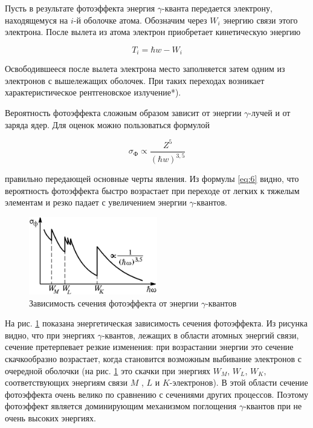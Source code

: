 \documentclass[a4paper,12pt]{article}
\begin{document}
Пусть в результате фотоэффекта энергия $\gamma$-кванта передается электрону, находящемуся на $i$-й оболочке атома. Обозначим через $W_i$ энергию связи этого электрона. После вылета из атома электрон приобретает кинетическую энергию

\begin{equation}\label{eq:5}
    T_i = \hbar w - W_i
\end{equation}

Освободившееся после вылета электрона место заполняется затем одним из электронов с вышележащих оболочек. При таких переходах возникает характеристическое рентгеновское излучение*).

Вероятность фотоэффекта сложным образом зависит от энергии $\gamma$-лучей и от заряда ядер. Для оценок можно пользоваться формулой

\begin{equation}\label{eq:6}
    \sigma_\text{Ф} \propto \frac{Z^5}{\left( \hbar w \right)^{3,5}}
\end{equation}

правильно передающей основные черты явления. Из формулы \eqref{eq:6} видно, что вероятность фотоэффекта быстро возрастает при переходе от легких к тяжелым элементам и резко падает с увеличением энергии $\gamma$-квантов.


\begin{figure}[h]
    \begin{center}
        \includegraphics[width = 0.5\textwidth]{pictures/area_energy.png}
        \caption{Зависимость сечения фотоэффекта от энергии $\gamma$-квантов}
    \label{pic:area_energy}
    \end{center}
\end{figure}


На рис. \ref{pic:area_energy} показана энергетическая зависимость сечения фотоэффекта. Из рисунка видно, что при энергиях $\gamma$-квантов, лежащих в области атомных энергий связи, сечение претерпевает резкие изменения: при возрастании энергии это сечение скачкообразно возрастает, когда становится возможным выбивание электронов с очередной оболочки (на рис. \ref{pic:area_energy} это скачки при энергиях $W_M$, $W_L$, $W_K$, соответствующих энергиям связи $M$ , $L$ и $K$-электронов). В этой области сечение фотоэффекта очень велико по сравнению с сечениями других процессов. Поэтому фотоэффект является доминирующим механизмом поглощения $\gamma$-квантов при не очень высоких энергиях.
\end{document}
